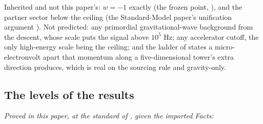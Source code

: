 \documentclass[11pt]{article}
\theoremstyle{definition}
\theoremstyle{plain}
\begin{document}
Inherited and not this paper's: $w = -1$ exactly (the frozen point, \cite[Prop.~4.2]{ButlerT10}), and the partner sector below the ceiling (the Standard-Model paper's unification argument \cite{ButlerT12}). Not predicted: any primordial gravitational-wave background from the descent, whose scale puts the signal above $10^{5}$ Hz; any accelerator cutoff, the only high-energy scale being the ceiling; and the ladder of states a micro-electronvolt apart that momentum along a five-dimensional tower's extra direction produces, which is real on the sourcing rule and gravity-only.

\subsection*{The levels of the results}
\label{c:note.dark-matter.setting-levels-results}
\emph{Proved in this paper, at the standard of \cite{ButlerT1}, given the imported Facts:}
\end{document}
